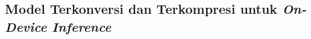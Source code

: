 \subsection{Model Terkonversi dan Terkompresi untuk \emph{On-Device Inference}}
\label{subsec:konversi-dan-kompresi-model}